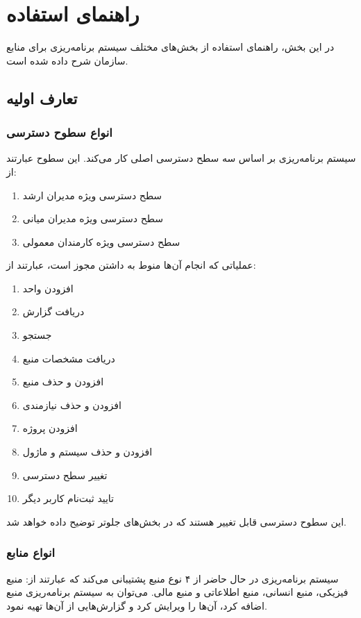 
\chapter{راهنمای استفاده}
در این بخش، راهنمای استفاده از بخش‌های مختلف سیستم برنامه‌ریزی برای منابع سازمان شرح داده شده است.
\newpage
\section{تعارف اولیه}
\subsection{انواع سطوح دسترسی}
سیستم برنامه‌ریزی بر اساس سه سطح دسترسی اصلی کار می‌کند. این سطوح عبارتند از:
\begin{enumerate}
	\item سطح دسترسی ویژه مدیران ارشد
	\item سطح دسترسی ویژه مدیران میانی
	\item سطح دسترسی ویژه کارمندان معمولی 
\end{enumerate}

عملیاتی که انجام آن‌ها منوط به داشتن مجوز است، عبارتند از:
\begin{enumerate}
	\item افزودن واحد
	\item دریافت گزارش
	\item جستجو
	\item دریافت مشخصات منبع
	\item افزودن و حذف منبع
	\item افزودن و حذف نیازمندی
	\item افزودن  پروژه
	\item افزودن و حذف سیستم و ماژول
	\item تغییر سطح دسترسی
	\item تایید ثبت‌نام کاربر دیگر
\end{enumerate}

این سطوح دسترسی قابل تغییر هستند که در بخش‌های جلوتر توضیح داده خواهد شد.

\subsection{انواع منابع}
سیستم برنامه‌ریزی در حال حاضر از ۴ نوع منبع پشتیبانی می‌کند که عبارتند از: منبع فیزیکی، منبع انسانی، منبع اطلاعاتی و منبع مالی. می‌توان به سیستم برنامه‌ریزی منبع اضافه کرد، آن‌ها را ویرایش کرد و گزارش‌هایی از آن‌ها تهیه نمود.

\newpage
